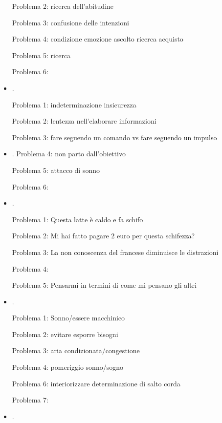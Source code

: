 \begin{itemize}
Problema 2: ricerca dell'abitudine

Problema 3: confusione delle intenzioni

Problema 4: condizione emozione ascolto ricerca acquisto

Problema 5: ricerca 

Problema 6: 


\item {}.

Problema 1: indeterminazione insicurezza

Problema 2: lentezza nell'elaborare informazioni

Problema 3: fare seguendo un comando vs fare seguendo un impulso

\item {}.
Problema 4: non parto dall'obiettivo

Problema 5: attacco di sonno

Problema 6: 

\item {}.

Problema 1: Questa latte è caldo e fa schifo

Problema 2: Mi hai fatto pagare 2 euro per questa schifezza?

Problema 3: La non conoscenza del francese diminuisce le distrazioni

Problema 4: 

Problema 5: Pensarmi in termini di come mi pensano gli altri

\item {}.

Problema 1: Sonno/essere macchinico

Problema 2: evitare esporre bisogni

Problema 3: aria condizionata/congestione

Problema 4: pomeriggio sonno/sogno

Problema 6: interiorizzare determinazione di salto corda

Problema 7: 

\item {}.


\end{itemize}
